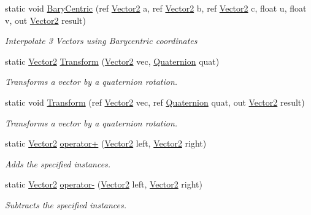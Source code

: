 \begin{DoxyCompactItemize}
static void \hyperlink{struct_open_t_k_1_1_vector2_a0ab8b94b5c685a6a8c08cd1f9aed328b}{Bary\-Centric} (ref \hyperlink{struct_open_t_k_1_1_vector2}{Vector2} a, ref \hyperlink{struct_open_t_k_1_1_vector2}{Vector2} b, ref \hyperlink{struct_open_t_k_1_1_vector2}{Vector2} c, float u, float v, out \hyperlink{struct_open_t_k_1_1_vector2}{Vector2} result)
\begin{DoxyCompactList}\small\item\em Interpolate 3 Vectors using Barycentric coordinates\end{DoxyCompactList}\item 
static \hyperlink{struct_open_t_k_1_1_vector2}{Vector2} \hyperlink{struct_open_t_k_1_1_vector2_a6b94457be2e31788398e1c3812fa8000}{Transform} (\hyperlink{struct_open_t_k_1_1_vector2}{Vector2} vec, \hyperlink{struct_open_t_k_1_1_quaternion}{Quaternion} quat)
\begin{DoxyCompactList}\small\item\em Transforms a vector by a quaternion rotation. \end{DoxyCompactList}\item 
static void \hyperlink{struct_open_t_k_1_1_vector2_a7d13af35d6bf2be4395e73de0dc48260}{Transform} (ref \hyperlink{struct_open_t_k_1_1_vector2}{Vector2} vec, ref \hyperlink{struct_open_t_k_1_1_quaternion}{Quaternion} quat, out \hyperlink{struct_open_t_k_1_1_vector2}{Vector2} result)
\begin{DoxyCompactList}\small\item\em Transforms a vector by a quaternion rotation. \end{DoxyCompactList}\item 
static \hyperlink{struct_open_t_k_1_1_vector2}{Vector2} \hyperlink{struct_open_t_k_1_1_vector2_adfee3dab77f54406bdb2941a8753e87a}{operator+} (\hyperlink{struct_open_t_k_1_1_vector2}{Vector2} left, \hyperlink{struct_open_t_k_1_1_vector2}{Vector2} right)
\begin{DoxyCompactList}\small\item\em Adds the specified instances. \end{DoxyCompactList}\item 
static \hyperlink{struct_open_t_k_1_1_vector2}{Vector2} \hyperlink{struct_open_t_k_1_1_vector2_afae626cd313039ce48c6e6e948d63aa0}{operator-\/} (\hyperlink{struct_open_t_k_1_1_vector2}{Vector2} left, \hyperlink{struct_open_t_k_1_1_vector2}{Vector2} right)
\begin{DoxyCompactList}\small\item\em Subtracts the specified instances. \end{DoxyCompactList}\item 

\end{DoxyCompactItemize}
